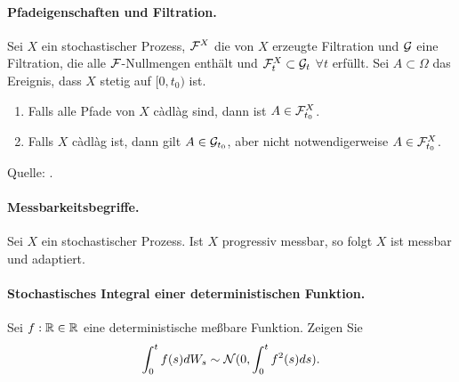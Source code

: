 \paragraph{Pfadeigenschaften und Filtration. }  Sei $X$ ein stochastischer Prozess, $\mathcal F^{X}$
die von $X$ erzeugte Filtration und $\mathcal G$ eine Filtration, die alle
$\mathcal F$-Nullmengen enthält und $\mathcal F^{X}_t \subset \mathcal G_t$ $\forall t$ erfüllt.
Sei $A \subset \Omega$ das Ereignis, dass $X$ stetig auf $[0, t_0)$ ist. 
\begin{enumerate}
    \item Falls alle Pfade von $X$ c\`adl\`ag sind, dann ist $A \in \mathcal F^{X}_{t_0}$.
    \item Falls $X$ c\`adl\`ag ist, dann gilt $A \in \mathcal G_{t_0}$, aber nicht
        notwendigerweise $A \in \mathcal F^{X}_{t_0}$.
\end{enumerate}
Quelle: \cite{Karatzas1991}.





\paragraph{Messbarkeitsbegriffe. } Sei $X$ ein stochastischer Prozess. Ist $X$
progressiv messbar, so folgt $X$ ist messbar und adaptiert.




\paragraph{Stochastisches Integral einer deterministischen Funktion. } Sei
$f: \mathbb R\in\mathbb R$ eine deterministische meßbare Funktion. Zeigen Sie 
\begin{equation}
    \int_{0}^{t} f(s) d W_s \sim \mathcal N(0, \int_{0}^{t} f^2(s) ds). 
\end{equation}




